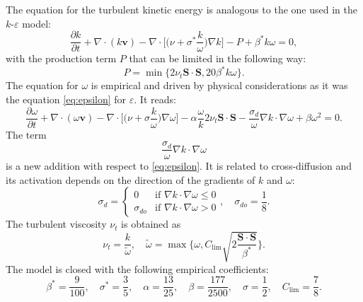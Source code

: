 The equation for the turbulent kinetic energy is analogous to the one used in 
the $k\text{-}\varepsilon$ model:
\begin{equation} \label{eq:komegak}
	\frac{\partial k}{\partial t} + \nabla \cdot (k\mathbf{v}) - \nabla \cdot 
\bigg[\bigg(\nu + \sigma^*\frac{k}{\omega}\bigg) \nabla k\bigg] -P + \beta^* k 
\omega = 0,
\end{equation}
with the production term $P$ that can be limited in the following way:
\begin{equation}
	P = \min \{ 2 \nu_t \mathbf{S} \cdot \mathbf{S}, 20 \beta^* k \omega \}.
\end{equation}
The equation for $\omega$ is empirical and driven by physical considerations as 
it was the equation \eqref{eq:epsilon} for $\varepsilon$. It reads:
\begin{equation} \label{eq:komegaomega}
	\frac{\partial \omega}{\partial t} + \nabla \cdot (\omega \mathbf{v}) - 
	\nabla \cdot \bigg[ \bigg( \nu + \sigma \frac{k}{\omega} \bigg) \nabla 
	\omega 
	\bigg] - \alpha \frac{\omega}{k} 2 \nu_t \mathbf{S} \cdot \mathbf{S} 
	-\frac{\sigma_d}{\omega} \nabla k \cdot 
	\nabla \omega+ \beta \omega^2 = 0.
\end{equation}
The term
\begin{equation}
\frac{\sigma_d}{\omega} \nabla k \cdot \nabla \omega
\end{equation}
is a new addition with respect to \eqref{eq:epsilon}. It is related to cross-diffusion and its activation depends on the 
direction of the gradients of $k$ and $\omega$:
\begin{equation}
\sigma_d =
\begin{cases}
0 &\text{if $\nabla k \cdot \nabla \omega \leq 0$}\\
\sigma_{do} &\text{if $\nabla k \cdot \nabla \omega > 0$}
\end{cases},
\quad \sigma_{do} = \frac{1}{8}.
\end{equation}
The turbulent viscosity $\nu_t$ is obtained as
\begin{equation}
\nu_t = \frac{k}{\tilde{\omega}}, \quad \tilde{\omega} = \max \Bigg\{ \omega, 
C_\text{lim} \sqrt{ 2\frac{\mathbf{S}\cdot\mathbf{S}}{\beta^*}} \Bigg\}.
\end{equation}
The model is closed with the following empirical coefficients:
\begin{equation}
	\beta^* = \frac{9}{100}, \quad \sigma^* = \frac{3}{5}, \quad \alpha = 
	\frac{13}{25}, \quad \beta = \frac{177}{2500}, \quad \sigma = \frac{1}{2}, 
	\quad C_\text{lim} = \frac{7}{8}.
\end{equation}

